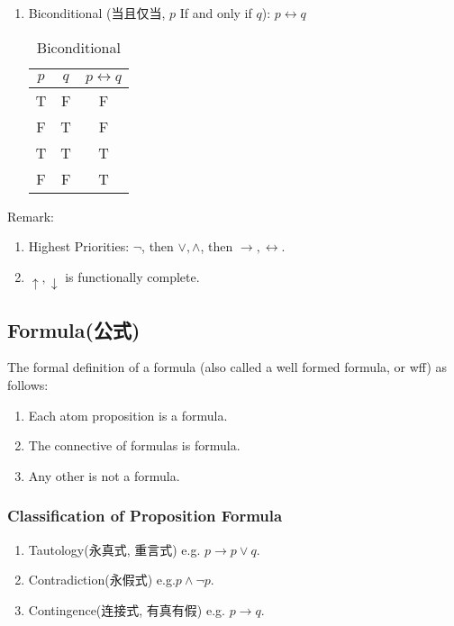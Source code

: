 \begin{enumerate}
    \item Biconditional (当且仅当, $p$ If and only if $q$): $p \longleftrightarrow q$
    \begin{table}[H]
        \centering
        \begin{tabular}[c]{|cc|c|}\hline
            $p$&$q$&$p \longleftrightarrow q$\\ \hline
            T & F & F \\
            F & T & F \\
            T & T & T \\
            F & F & T \\ \hline
        \end{tabular}
        \caption{Biconditional}
    \end{table}
\end{enumerate}

Remark: 
\begin{enumerate}
    \item Highest Priorities: $\neg$, then $\lor,\land$, then $\longrightarrow, \longleftrightarrow$.
    \item $\uparrow, \downarrow$ is functionally complete. 
\end{enumerate}

\subsection{Formula(公式)}
\begin{definition}
    The formal definition of a \textcolor{light_red}{formula} (also called a well formed formula, or wff) as follows: 
    \begin{enumerate}
        \item Each atom proposition is a formula.
        \item The connective of formulas is formula.
        \item Any other is not a formula. 
    \end{enumerate}
\end{definition}

\subsubsection{Classification of Proposition Formula}
\begin{enumerate}
    \item Tautology(永真式, 重言式) e.g. $p \longrightarrow p\lor q$. 
    \item Contradiction(永假式) e.g.$p\land \neg p $.
    \item Contingence(连接式, 有真有假) e.g. $p\longrightarrow q$. 
\end{enumerate}

